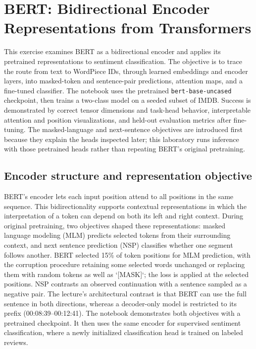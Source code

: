 \documentclass[../labs.tex]{subfiles}
\begin{document}
\providecommand{\labThreeFigureRoot}{figures/lab03}
\chapter{BERT: Bidirectional Encoder Representations from Transformers}
\label{ch:lab03-bert}

This exercise examines BERT as a bidirectional encoder and applies its pretrained representations to sentiment classification. The objective is to trace the route from text to WordPiece IDs, through learned embeddings and encoder layers, into masked-token and sentence-pair predictions, attention maps, and a fine-tuned classifier. The notebook uses the pretrained \texttt{bert-base-uncased} checkpoint, then trains a two-class model on a seeded subset of IMDB. Success is demonstrated by correct tensor dimensions and task-head behavior, interpretable attention and position visualizations, and held-out evaluation metrics after fine-tuning. The masked-language and next-sentence objectives are introduced first because they explain the heads inspected later; this laboratory runs inference with those pretrained heads rather than repeating BERT’s original pretraining.

\section{Encoder structure and representation objective}

BERT’s encoder lets each input position attend to all positions in the same sequence. This bidirectionality supports contextual representations in which the interpretation of a token can depend on both its left and right context. During original pretraining, two objectives shaped these representations: masked language modeling (MLM) predicts selected tokens from their surrounding context, and next sentence prediction (NSP) classifies whether one segment follows another. BERT selected 15\% of token positions for MLM prediction, with the corruption procedure retaining some selected words unchanged or replacing them with random tokens as well as `[MASK]`; the loss is applied at the selected positions. NSP contrasts an observed continuation with a sentence sampled as a negative pair. The lecture’s architectural contrast is that BERT can use the full sentence in both directions, whereas a decoder-only model is restricted to its prefix (00:08:39–00:12:41). The notebook demonstrates both objectives with a pretrained checkpoint. It then uses the same encoder for supervised sentiment classification, where a newly initialized classification head is trained on labeled reviews.
\end{document}

